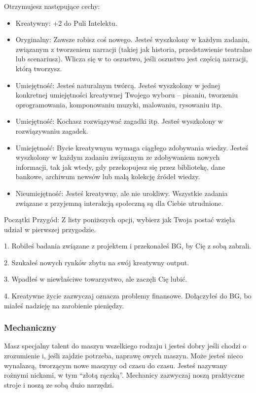 Otrzymujesz następujące cechy:
\begin{itemize}
\item Kreatywny: +2 do Puli Intelektu.
\item Oryginalny: Zawsze robisz coś nowego. Jesteś wyszkolony w każdym zadaniu, związanym z tworzeniem narracji (takiej jak historia, przedstawienie teatralne lub scenariusz). Wlicza się w to oszustwo, jeśli oszustwo jest częścią narracji, którą tworzysz.
\item  Umiejętność: Jesteś naturalnym twórcą. Jesteś wyszkolony w jednej konkretnej umiejętności kreatywnej Twojego wyboru – pisaniu, tworzeniu oprogramowania, komponowaniu muzyki, malowaniu, rysowaniu itp.
\item Umiejętność: Kochasz rozwiązywać zagadki itp. Jesteś wyszkolony w rozwiązywaniu zagadek.
\item Umiejętność: Bycie kreatywnym wymaga ciągłego zdobywania wiedzy. Jesteś wyszkolony w każdym zadaniu związanym ze zdobywaniem nowych informacji, tak jak wtedy, gdy przekopujesz się przez bibliotekę, dane bankowe, archiwum newsów lub malą kolekcję źródeł wiedzy.
\item  Nieumiejętność: Jesteś kreatywny, ale nie urokliwy. Wszystkie zadania związane z przyjemną interakcją społeczną są dla Ciebie utrudnione.
 \end{itemize}
 
Początki Przygód: Z listy poniższych opcji, wybierz jak Twoja postać wzięła udział w pierwszej przygodzie.

1. Robiłeś badania związane z projektem i przekonałeś BG, by Cię z sobą zabrali.

2. Szukałeś nowych rynków zbytu na swój kreatywny output.

3. Wpadłeś w niewłaściwe towarzystwo, ale zaczęli Cię lubić.

4. Kreatywne życie zazwyczaj oznacza problemy finansowe. Dołączyłeś do BG, bo miałeś nadzieję na zarobienie pieniędzy.

\subsubsection{Mechaniczny}

Masz specjalny talent do maszyn wszelkiego rodzaju i jesteś dobry jeśli chodzi o zrozumienie i, jeśli zajdzie potrzeba, naprawę owych maszyn. Może jesteś nieco wynalazcą, tworzącym nowe maszyny od czasu do czasu. Jesteś nazywany rożnymi nickami, w tym “złotą rączką”. Mechanicy zazwyczaj noszą praktyczne stroje i noszą ze sobą dużo narzędzi.

